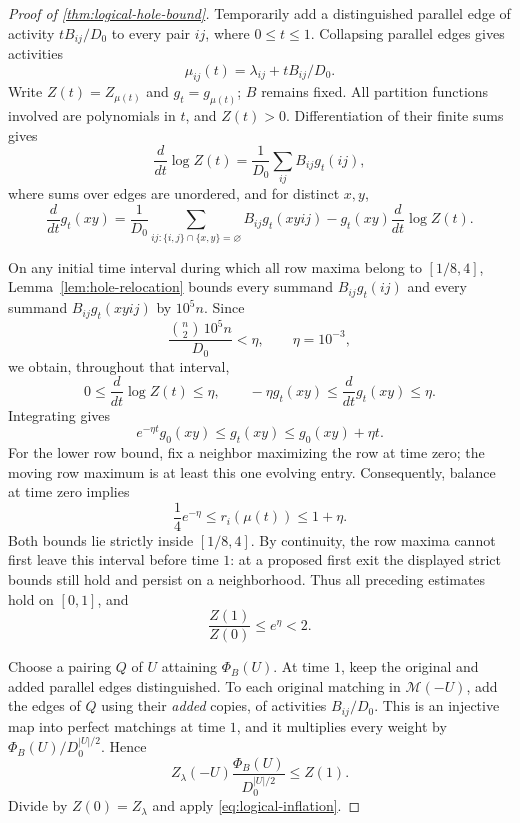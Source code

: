 \documentclass[11pt]{article}
\theoremstyle{definition}
\theoremstyle{remark}
\numberwithin{equation}{section}
\begin{document}
\begin{proof}[Proof of \cref{thm:logical-hole-bound}]
Temporarily add a distinguished parallel edge of activity $tB_{ij}/D_0$
to every pair $ij$, where $0\le t\le1$.  Collapsing parallel edges gives
activities
\[
 \mu_{ij}(t)=\lambda_{ij}+tB_{ij}/D_0.
\]
Write $Z(t)=Z_{\mu(t)}$ and $g_t=g_{\mu(t)}$; $B$ remains fixed.
All partition functions involved are polynomials in $t$, and $Z(t)>0$.
Differentiation of their finite sums gives
\begin{equation}
\label{eq:partition-derivative}
 \frac{d}{dt}\log Z(t)=\frac1{D_0}\sum_{ij}B_{ij}g_t(ij),
\end{equation}
where sums over edges are unordered, and for distinct $x,y$,
\begin{equation}
\label{eq:hole-derivative}
 \frac{d}{dt}g_t(xy)
 =\frac1{D_0}\sum_{ij:\{i,j\}\cap\{x,y\}=\varnothing}
                  B_{ij}g_t(xyij)
       -g_t(xy)\frac{d}{dt}\log Z(t).
\end{equation}

On any initial time interval during which all row maxima belong to
$[1/8,4]$, Lemma~\ref{lem:hole-relocation} bounds every summand
$B_{ij}g_t(ij)$ and every summand $B_{ij}g_t(xyij)$ by $10^5n$.
Since
\[
 \frac{\binom n2\,10^5n}{D_0}<\eta,
 \qquad \eta=10^{-3},
\]
we obtain, throughout that interval,
\[
 0\le\frac{d}{dt}\log Z(t)\le\eta,
 \qquad
 -\eta g_t(xy)\le\frac{d}{dt}g_t(xy)\le\eta.
\]
Integrating gives
\[
 e^{-\eta t}g_0(xy)\le g_t(xy)\le g_0(xy)+\eta t.
\]
For the lower row bound, fix a neighbor maximizing the row at time zero;
the moving row maximum is at least this one evolving entry.
Consequently, balance at time zero implies
\[
 \frac14e^{-\eta}\le r_i(\mu(t))\le1+\eta.
\]
Both bounds lie strictly inside $[1/8,4]$.  By continuity, the row maxima
cannot first leave this interval before time $1$: at a proposed first
exit the displayed strict bounds still hold and persist on a
neighborhood.  Thus all preceding estimates hold on $[0,1]$, and
\begin{equation}
\label{eq:logical-inflation}
 \frac{Z(1)}{Z(0)}\le e^\eta<2.
\end{equation}

Choose a pairing $Q$ of $U$ attaining $\Phi_B(U)$.  At time $1$, keep the
original and added parallel edges distinguished.  To each original
matching in $\mathcal M(-U)$, add the edges of $Q$ using their
\emph{added} copies, of activities $B_{ij}/D_0$.  This is an injective
map into perfect matchings at time $1$, and it multiplies every weight
by $\Phi_B(U)/D_0^{|U|/2}$.  Hence
\[
 Z_\lambda(-U)\frac{\Phi_B(U)}{D_0^{|U|/2}}\le Z(1).
\]
Divide by $Z(0)=Z_\lambda$ and apply
\eqref{eq:logical-inflation}.
\end{proof}
\end{document}
